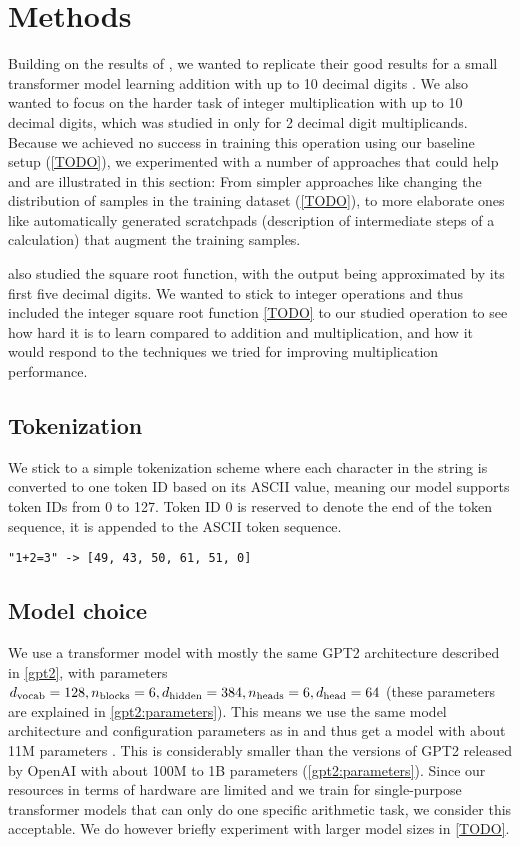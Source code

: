 \section{Methods}

Building on the results of \cite{teaching}, we wanted to replicate their good results for a small transformer model learning addition with up to 10 decimal digits .
We also wanted to focus on the harder task of integer multiplication with up to 10 decimal digits, which was studied in \cite{teaching} only for 2 decimal digit multiplicands.
Because we achieved no success in training this operation using our baseline setup (\cref{TODO}), we experimented with a number of approaches that could help and are illustrated in this section: From simpler approaches like changing the distribution of samples in the training dataset (\cref{TODO}), to more elaborate ones like automatically generated scratchpads (description of intermediate steps of a calculation) that augment the training samples.

\cite{teaching} also studied the square root function, with the output being approximated by its first five decimal digits. We wanted to stick to integer operations and thus included the integer square root function \cref{TODO} to our studied operation to see how hard it is to learn compared to addition and multiplication, and how it would respond to the techniques we tried for improving multiplication performance.

\subsection{Tokenization}
We stick to a simple tokenization scheme where each character in the string is converted to one token ID based on its ASCII value, meaning our model supports token IDs from 0 to 127. Token ID 0 is reserved to denote the end of the token sequence, it is appended to the ASCII token sequence.

\begin{lstlisting}
"1+2=3" -> [49, 43, 50, 61, 51, 0]
\end{lstlisting}


\subsection{Model choice}
We use a transformer model with mostly the same GPT2 architecture described in \cref{gpt2}, with parameters ${d_\textrm{vocab}}=128, {n_\textrm{blocks}}=6, {d_\textrm{hidden}}=384, {n_\textrm{heads}}=6, {d_\textrm{head}}=64$ (these parameters are explained in \cref{gpt2:parameters}).
This means we use the same model architecture and configuration parameters as in \cite{teaching} and thus get a model with about 11M parameters . This is considerably smaller than the versions of GPT2 released by OpenAI with about 100M to 1B parameters (\cref{gpt2:parameters}).
Since our resources in terms of hardware are limited and we train for single-purpose transformer models that can only do one specific arithmetic task, we consider this acceptable.
We do however briefly experiment with larger model sizes in \cref{TODO}.

